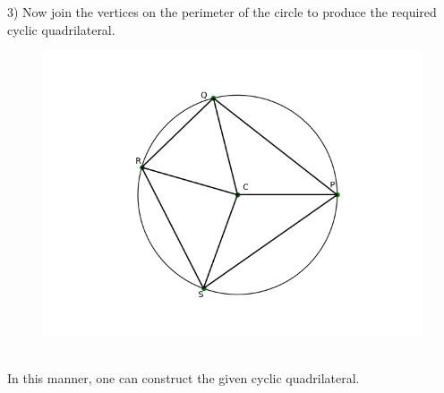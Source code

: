 \documentclass[8pt, twocolumn]{article}
\begin{document}
3) Now join the vertices on the perimeter of the circle to produce the required cyclic quadrilateral.
\begin{figure}[ht]
    \centering
    \includegraphics[scale = 0.5]{figs/cnstrct_fig3.png}
\end{figure}\\

In this manner, one can construct the given cyclic quadrilateral.
\end{document}

